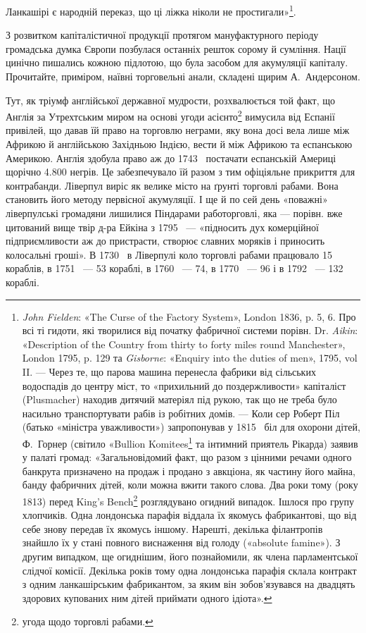 Ланкашірі є народній переказ, що ці ліжка ніколи не простигали»\footnote{
\emph{John Fielden}: «The Curse of the Factory System», London 1836, p. 5, 6.
Про всі ті гидоти, які творилися від початку фабричної системи порівн.
Dr. \emph{Aikin}: «Description of the Country from thirty to forty miles round
Manchester», London 1795, p. 129 та \emph{Gisborne}: «Enquiry into the duties of
men», 1795, vol II. — Через те, що парова машина перенесла
фабрики від сільських водоспадів до центру міст, то «прихильний до поздержливости»
капіталіст (Plusmacher) находив дитячий матеріял під рукою, так що не треба було
насильно транспортувати рабів із робітних домів. — Коли сер Роберт Піл
(батько «міністра уважливости») запропонував у 1815~ біл
для охорони дітей, Ф.~Горнер (світило «Bullion Komitees\footnote*{
комітет у справах зливків. 
} та інтимний приятель Рікарда) заявив у палаті громад:
«Загальновідомий факт, що разом з цінними речами одного банкрута
призначено на продаж і продано з авкціона, як частину його майна, банду
фабричних дітей, коли можна вжити такого слова. Два роки тому (року
1813) перед King’s Bench\footnote*{
найвищим судом. 
} розглядувано огидний випадок. Ішлося про
групу хлопчиків. Одна лондонська парафія віддала їх якомусь фабрикантові,
що від себе знову передав їх якомусь іншому. Нарешті, декілька філантропів
знайшло їх у стані повного виснаження від голоду («absolute
famine»). З другим випадком, ще огиднішим, його познайомили, як члена
парламентської слідчої комісії. Декілька років тому одна лондонська
парафія склала контракт з одним ланкашірським фабрикантом, за яким
він зобов’язувався на двадцять здорових купованих ним дітей приймати
одного ідіота».
}.

З розвитком капіталістичної продукції протягом мануфактурного
періоду громадська думка Європи позбулася останніх решток
сорому й сумління. Нації цинічно пишались кожною підлотою,
що була засобом для акумуляції капіталу. Прочитайте, приміром,
наївні торговельні анали, складені щирим А.~Андерсоном.

Тут, як тріумф англійської державної мудрости, розхвалюється
той факт, що Англія за Утрехтським миром на основі
угоди асієнто\footnote*{
угода щодо торговлі рабами. 
} вимусила від Еспанії привілей, що давав їй
право на торговлю неграми, яку вона досі вела лише між Африкою
й англійською Західньою Індією, вести й між Африкою та
еспанською Америкою. Англія здобула право аж до 1743~ постачати
еспанській Америці щорічно \num{4.800} негрів. Це забезпечувало
їй разом з тим офіціяльне прикриття для контрабанди.
Ліверпул виріс як велике місто на ґрунті торговлі рабами.
Вона становить його методу первісної акумуляції. І ще й по сей
день «поважні» ліверпулські громадяни лишилися Піндарами
работорговлі, яка — порівн. вже цитований вище твір д-ра Ейкіна
з 1795~ — «підносить дух комерційної підприємливости аж до
пристрасти, створює славних моряків і приносить колосальні
гроші». В 1730~ в Ліверпулі коло торговлі рабами працювало
15 кораблів, в 1751~ — 53 кораблі, в 1760~ — 74, в 1770~ —
96 і в 1792~ — 132 кораблі.

